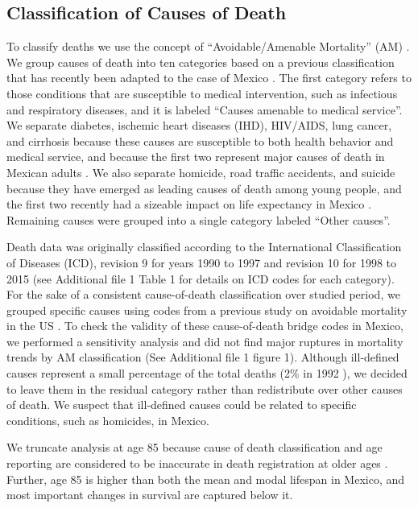 \documentclass{bmcart}
\begin{document}
\subsection*{Classification of Causes of Death}
To classify deaths we use the concept of ``Avoidable/Amenable Mortality'' (AM) \cite{nolte&mckee2004, nolte&mckee2008}. We group causes of death into ten categories based on a previous classification  \cite{elo2014} that has recently been adapted to the case of Mexico \cite{Aburto2015}. The first category refers to those conditions that are susceptible to medical intervention, such as infectious and respiratory diseases, and it is labeled ``Causes amenable to medical service''. We separate diabetes, ischemic heart diseases (IHD), HIV/AIDS, lung
cancer, and cirrhosis because these causes are susceptible to both health behavior
and medical service, and because the first two represent major causes of death
in Mexican adults \cite{gomez2016dissonant}. We also separate
homicide, road traffic accidents, and suicide because they have emerged as
leading causes of death among young people, and the first two recently had a sizeable
impact on life expectancy in Mexico \cite{Aburto2015}. Remaining causes were grouped into a single category labeled ``Other causes''. 

Death data was originally classified according to the International Classification of Diseases (ICD), revision 9 for years 1990 to 1997 and revision 10 for 1998 to 2015 (see Additional file 1 Table 1 for details on ICD codes for each category). For the sake of a consistent cause-of-death classification over studied period, we grouped specific causes using codes from a previous study on avoidable mortality in the US \cite{elo2014}. To check the validity of these cause-of-death bridge codes in Mexico, we performed a sensitivity analysis and did not find major ruptures in mortality trends by AM classification (See Additional file 1 figure 1). Although ill-defined causes represent a small percentage of the total deaths (2\% in 1992 \cite{rivera2002epidemiological}), we decided to leave them in the residual category rather than redistribute over other causes of death. We suspect that ill-defined causes could be related to specific conditions, such as homicides, in Mexico.

We truncate analysis at age 85 because cause of death classification and age reporting are considered to be inaccurate in death registration at older ages \cite{tobias2001}. Further, age 85 is higher than both the mean and modal lifespan in Mexico, and most important changes in survival are captured below it. 
\end{document}
